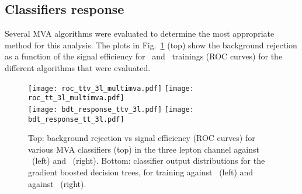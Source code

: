 
\subsection{Classifiers response}
Several MVA algorithms were evaluated to determine the most appropriate method for this analysis. The plots in Fig.~\ref{roc} (top) show the background rejection as a function of the signal efficiency for \ttbar\ and \ttV\ trainings (ROC curves) for the different algorithms that were evaluated.

\begin{figure} [!h]
  \centering
   \texttt{[image: roc\_ttv\_3l\_multimva.pdf]}
   \texttt{[image: roc\_tt\_3l\_multimva.pdf]} \\
   \texttt{[image: bdt\_response\_ttv\_3l.pdf]}
   \texttt{[image: bdt\_response\_tt\_3l.pdf]}
\caption[MVA classifiers performance.]{Top: background rejection vs signal efficiency (ROC curves) for various MVA classifiers (top) in the three lepton channel against \ttV\ (left) and \ttbar\ (right). Bottom: classifier output distributions for the gradient boosted decision trees, for training against \ttV\ (left) and against \ttbar\ (right).}
\label{roc}
\end{figure} 


